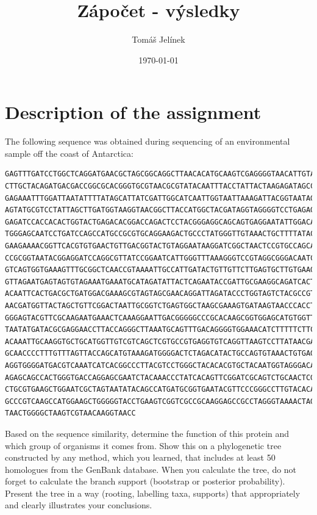 \documentclass{article}
\title{Zápočet - výsledky}
\author{Tomáš Jelínek}
\date{\today}
\begin{document}
\maketitle
\tableofcontents

\section{Description of the assignment}
The following sequence was obtained during sequencing of an environmental sample off the coast
of Antarctica:

\begin{verbatim}
GAGTTTGATCCTGGCTCAGGATGAACGCTAGCGGCAGGCTTAACACATGCAAGTCGAGGGGTAACATTGTAG
CTTGCTACAGATGACGACCGGCGCACGGGTGCGTAACGCGTATACAATTTACCTATTACTAAGAGATAGCCCA
GAGAAATTTGGATTAATATTTTATAGCATTATCGATTGGCATCAATTGGTAATTAAAGATTACGGTAATAGATG
AGTATGCGTCCTATTAGCTTGATGGTAAGGTAACGGCTTACCATGGCTACGATAGGTAGGGGTCCTGAGAGG
GAGATCCACCACACTGGTACTGAGACACGGACCAGACTCCTACGGGAGGCAGCAGTGAGGAATATTGGACAA
TGGGAGCAATCCTGATCCAGCCATGCCGCGTGCAGGAAGACTGCCCTATGGGTTGTAAACTGCTTTTATACAG
GAAGAAAACGGTTCACGTGTGAACTGTTGACGGTACTGTAGGAATAAGGATCGGCTAACTCCGTGCCAGCAG
CCGCGGTAATACGGAGGATCCAGGCGTTATCCGGAATCATTGGGTTTAAAGGGTCCGTAGGCGGGACAATCA
GTCAGTGGTGAAAGTTTGCGGCTCAACCGTAAAATTGCCATTGATACTGTTGTTCTTGAGTGCTTGTGAAGTG
GTTAGAATGAGTAGTGTAGAAATGAAATGCATAGATATTACTCAGAATACCGATTGCGAAGGCAGATCACTA
ACAATTCACTGACGCTGATGGACGAAAGCGTAGTAGCGAACAGGATTAGATACCCTGGTAGTCTACGCCGTA
AACGATGGTTACTAGCTGTTCGGACTAATTGCGGTCTGAGTGGCTAAGCGAAAGTGATAAGTAACCCACCTG
GGGAGTACGTTCGCAAGAATGAAACTCAAAGGAATTGACGGGGGCCCGCACAAGCGGTGGAGCATGTGGTT
TAATATGATACGCGAGGAACCTTACCAGGGCTTAAATGCAGTTTGACAGGGGTGGAAACATCTTTTTCTTCGG
ACAAATTGCAAGGTGCTGCATGGTTGTCGTCAGCTCGTGCCGTGAGGTGTCAGGTTAAGTCCTTATAACGAGC
GCAACCCCTTTGTTTAGTTACCAGCATGTAAAGATGGGGACTCTAGACATACTGCCAGTGTAAACTGTGAGGA
AGGTGGGGATGACGTCAAATCATCACGGCCCTTACGTCCTGGGCTACACACGTGCTACAATGGTAGGGACAG
AGAGCAGCCACTGGGTGACCAGGAGCGAATCTACAAACCCTATCACAGTTCGGATCGCAGTCTGCAACTCGA
CTGCGTGAAGCTGGAATCGCTAGTAATATACAGCCATGATGCGGTGAATACGTTCCCGGGCCTTGTACACACC
GCCCGTCAAGCCATGGAAGCTGGGGGTACCTGAAGTCGGTCGCCGCAAGGAGCCGCCTAGGGTAAAACTAG
TAACTGGGGCTAAGTCGTAACAAGGTAACC
\end{verbatim}

Based on the sequence similarity, determine the function of this protein and which group of
organisms it comes from. Show this on a phylogenetic tree constructed by any method, which you
learned, that includes at least 50 homologues from the GenBank database. When you calculate the
tree, do not forget to calculate the branch support (bootstrap or posterior probability). Present the
tree in a way (rooting, labelling taxa, supports) that appropriately and clearly illustrates your
conclusions.
\end{document}

